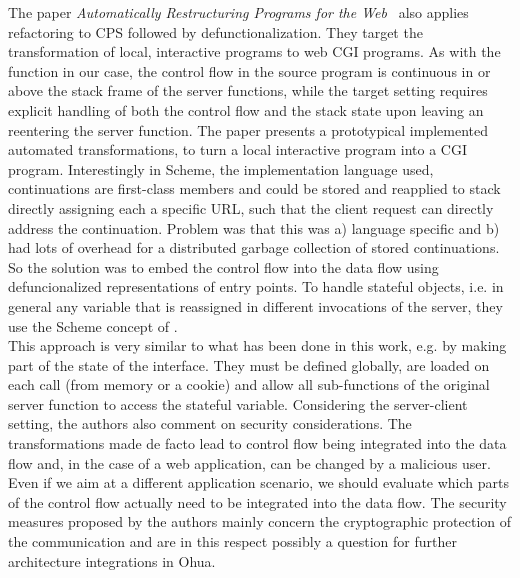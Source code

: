 The paper \emph{Automatically Restructuring Programs for the Web}~\cite{graunke2001automatically} also applies refactoring to CPS followed by defunctionalization. They target the transformation of local, interactive programs to web CGI programs. As with the  function in our case, the control flow in the source program is continuous in or above the stack frame of the server functions, while the target setting requires explicit handling of both the control flow and the stack state upon leaving an reentering the server function. The paper presents a 
 prototypical implemented automated transformations, to turn a local interactive program into a CGI program. Interestingly in Scheme, the implementation language used, continuations are first-class members and could be stored and reapplied to stack directly assigning each a specific URL, such that the client request can directly address the continuation. Problem was that this was a) language specific and b) had lots of overhead for a distributed garbage collection of stored continuations. So the solution was to embed the control flow into the data flow using defuncionalized representations of entry points. To handle stateful objects, i.e. in general any variable that is reassigned in different invocations of the server, they use the Scheme concept of . \\
 
 This approach is very similar to what has been done in this work, e.g. by making part of the state of the interface. They must be defined globally, are loaded on each call (from memory or a cookie) and allow all sub-functions of the original server function to access the stateful variable. Considering the server-client setting, the authors also comment on security considerations. The transformations made de facto lead to control flow being integrated into the data flow and, in the case of a web application, can be changed by a malicious user. Even if we aim at a different application scenario, we should evaluate which parts of the control flow actually need to be integrated into the data flow. The security measures proposed by the authors mainly concern the cryptographic protection of the communication and are in this respect possibly a question for further architecture integrations in Ohua. \\

